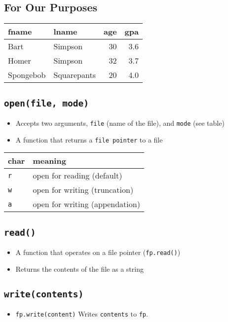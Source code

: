 \documentclass[11pt]{article}
\begin{document}
\subsection{For Our Purposes}
\label{sec:org9da459d}
\begin{center}
\begin{tabular}{llrr}
fname & lname & age & gpa\\
\hline
Bart & Simpson & 30 & 3.6\\
Homer & Simpson & 32 & 3.7\\
Spongebob & Squarepants & 20 & 4.0\\
\end{tabular}
\end{center}
\subsection{\texttt{open(file, mode)}}
\label{sec:orga24cb89}
\begin{itemize}
\item Accepts two arguments, \texttt{file} (name of the file), and \texttt{mode} (see table)
\item A function that returns a \texttt{file pointer} to a file
\end{itemize}
\begin{center}
\begin{tabular}{ll}
char & meaning\\
\hline
\texttt{r} & open for reading (default)\\
\texttt{w} & open for writing (truncation)\\
\texttt{a} & open for writing (appendation)\\
\end{tabular}
\end{center}
\subsection{\texttt{read()}}
\label{sec:orgfcedc26}
\begin{itemize}
\item A function that operates on a file pointer (\texttt{fp.read()})
\item Returns the contents of the file as a string
\end{itemize}
\subsection{\texttt{write(contents)}}
\label{sec:org28d84b4}
\begin{itemize}
\item \texttt{fp.write(content)} Writes \texttt{contents} to \texttt{fp}.
\end{itemize}
\end{document}
